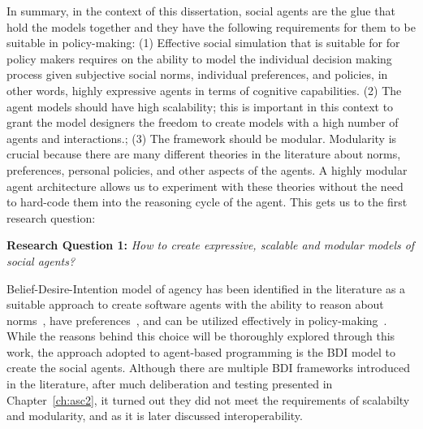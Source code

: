 In summary, in the context of this dissertation, social agents are the glue that hold the models together and they have the following requirements for them to be suitable in policy-making: (1) Effective social simulation that is suitable for for policy makers requires on the ability to model the individual decision making process given subjective social norms, individual preferences, and policies, in other words, highly expressive agents in terms of cognitive capabilities. (2) The agent models should have high scalability; this is important in this context to grant the model designers the freedom to create models with a high number of agents and interactions.; (3) The framework should be modular. Modularity is crucial because there are many different theories in the literature about norms, preferences, personal policies, and other aspects of the agents. A highly modular agent architecture allows us to experiment with these theories without the need to hard-code them into the reasoning cycle of the agent. This gets us to the first research question:



\begin{displayquote}
\textbf{Research Question 1:} \textit{How to create expressive, scalable and modular models of social agents?}
\end{displayquote}



 Belief-Desire-Intention model of agency has been identified in the literature as a suitable approach to create software agents with the ability to reason about norms~\cite{Dignum2002MotivationalNorms,Deljoo2018APlaces}, have preferences~\cite{Visser2016}, and can be utilized effectively in policy-making~\cite{dignum2008towardsagents}. While the reasons behind this choice will be thoroughly explored through this work, the approach adopted to agent-based programming is the BDI model to create the social agents. Although there are multiple BDI frameworks introduced in the literature, after much deliberation and testing presented in Chapter~\ref{ch:asc2}, it turned out they did not meet the requirements of scalabilty and modularity, and as it is later discussed interoperability.


